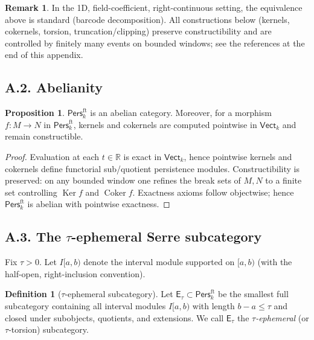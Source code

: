 \documentclass[11pt]{article}
\numberwithin{equation}{section}
\theoremstyle{plain}
\theoremstyle{definition}
\theoremstyle{remark}
\DeclareMathOperator{\Ker}{Ker}
\DeclareMathOperator{\Coker}{Coker}
\newcommand{\Pers}{\mathsf{Pers}}
\newcommand{\Vect}{\mathsf{Vect}}
\theoremstyle{plain}
\theoremstyle{definition}
\numberwithin{equation}{section}
\newtheorem{proposition}[theorem]{Proposition}
\theoremstyle{definition}
\newtheorem{definition}[theorem]{Definition}
\newtheorem{remark}[theorem]{Remark}
\numberwithin{equation}{section}
\theoremstyle{plain}
\theoremstyle{definition}
\theoremstyle{remark}
\begin{document}
\begin{remark}
In the 1D, field-coefficient, right-continuous setting, the equivalence above is standard (barcode decomposition). All constructions below (kernels, cokernels, torsion, truncation/clipping) preserve constructibility and are controlled by finitely many events on bounded windows; see the references at the end of this appendix.
\end{remark}

\subsection*{A.2. Abelianity}
\begin{proposition}\label{A:prop:abelian}
\(\Pers^{\mathrm{ft}}_k\) is an abelian category.
Moreover, for a morphism \(f:M\to N\) in \(\Pers^{\mathrm{ft}}_k\),
kernels and cokernels are computed pointwise in \(\Vect_k\) and remain constructible.
\end{proposition}

\begin{proof}
Evaluation at each \(t\in\mathbb{R}\) is exact in \(\Vect_k\), hence pointwise kernels and cokernels define functorial sub/quotient persistence modules.
Constructibility is preserved: on any bounded window one refines the break sets of \(M,N\) to a finite set controlling \(\Ker f\) and \(\Coker f\).
Exactness axioms follow objectwise; hence \(\Pers^{\mathrm{ft}}_k\) is abelian with pointwise exactness.
\end{proof}

\subsection*{A.3. The \texorpdfstring{$\tau$}{tau}-ephemeral Serre subcategory}
Fix \(\tau>0\).
Let \(I[a,b)\) denote the interval module supported on \([a,b)\) (with the half-open, right-inclusion convention).

\begin{definition}[\(\tau\)-ephemeral subcategory]\label{A:def:Etau}
Let \(\mathsf{E}_\tau\subset\Pers^{\mathrm{ft}}_k\) be the smallest full subcategory
containing all interval modules \(I[a,b)\) with length \(b-a\le \tau\) and closed under subobjects, quotients, and extensions.
We call \(\mathsf{E}_\tau\) the \emph{\(\tau\)-ephemeral} (or \(\tau\)-torsion) subcategory.
\end{definition}
\end{document}
